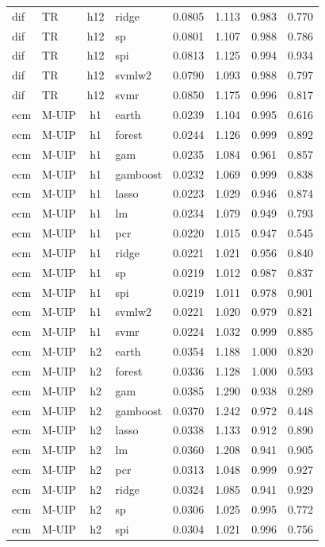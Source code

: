 \begin{ThreePartTable}
\begin{longtable}[t]{llclcccc}
dif & TR & h12 & ridge & 0.0805 & 1.113 & 0.983 & 0.770\\
dif & TR & h12 & sp & 0.0801 & 1.107 & 0.988 & 0.786\\
dif & TR & h12 & spi & 0.0813 & 1.125 & 0.994 & 0.934\\
dif & TR & h12 & svmlw2 & 0.0790 & 1.093 & 0.988 & 0.797\\
dif & TR & h12 & svmr & 0.0850 & 1.175 & 0.996 & 0.817\\
\addlinespace
ecm & M-UIP & h1 & earth & 0.0239 & 1.104 & 0.995 & 0.616\\
ecm & M-UIP & h1 & forest & 0.0244 & 1.126 & 0.999 & 0.892\\
ecm & M-UIP & h1 & gam & 0.0235 & 1.084 & 0.961 & 0.857\\
ecm & M-UIP & h1 & gamboost & 0.0232 & 1.069 & 0.999 & 0.838\\
ecm & M-UIP & h1 & lasso & 0.0223 & 1.029 & 0.946 & 0.874\\
ecm & M-UIP & h1 & lm & 0.0234 & 1.079 & 0.949 & 0.793\\
ecm & M-UIP & h1 & pcr & 0.0220 & 1.015 & 0.947 & 0.545\\
ecm & M-UIP & h1 & ridge & 0.0221 & 1.021 & 0.956 & 0.840\\
ecm & M-UIP & h1 & sp & 0.0219 & 1.012 & 0.987 & 0.837\\
ecm & M-UIP & h1 & spi & 0.0219 & 1.011 & 0.978 & 0.901\\
ecm & M-UIP & h1 & svmlw2 & 0.0221 & 1.020 & 0.979 & 0.821\\
ecm & M-UIP & h1 & svmr & 0.0224 & 1.032 & 0.999 & 0.885\\
\addlinespace
ecm & M-UIP & h2 & earth & 0.0354 & 1.188 & 1.000 & 0.820\\
ecm & M-UIP & h2 & forest & 0.0336 & 1.128 & 1.000 & 0.593\\
ecm & M-UIP & h2 & gam & 0.0385 & 1.290 & 0.938 & 0.289\\
ecm & M-UIP & h2 & gamboost & 0.0370 & 1.242 & 0.972 & 0.448\\
ecm & M-UIP & h2 & lasso & 0.0338 & 1.133 & 0.912 & 0.890\\
ecm & M-UIP & h2 & lm & 0.0360 & 1.208 & 0.941 & 0.905\\
ecm & M-UIP & h2 & pcr & 0.0313 & 1.048 & 0.999 & 0.927\\
ecm & M-UIP & h2 & ridge & 0.0324 & 1.085 & 0.941 & 0.929\\
ecm & M-UIP & h2 & sp & 0.0306 & 1.025 & 0.995 & 0.772\\
ecm & M-UIP & h2 & spi & 0.0304 & 1.021 & 0.996 & 0.756\\

\end{longtable}
\end{ThreePartTable}
